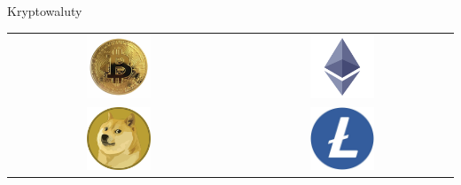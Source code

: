 \subsection{}
\begin{frame}{Kryptowaluty}
\begin{center}
    \begin{tabular}{cc}
        \includegraphics[width=0.3\textwidth, height=0.3\textwidth ]{applications/graphics/Bitcoin.jpg} & \includegraphics[width=0.3\textwidth, height=0.3\textwidth]{applications/graphics/Ethereum.png} \\
        \includegraphics[width=0.3\textwidth, height=0.3\textwidth]{applications/graphics/Dogecoin.png} & \includegraphics[width=0.3\textwidth, height=0.3\textwidth]{applications/graphics/Litecoin.jpg} \\
    \end{tabular}
\end{center}
    
\end{frame}

